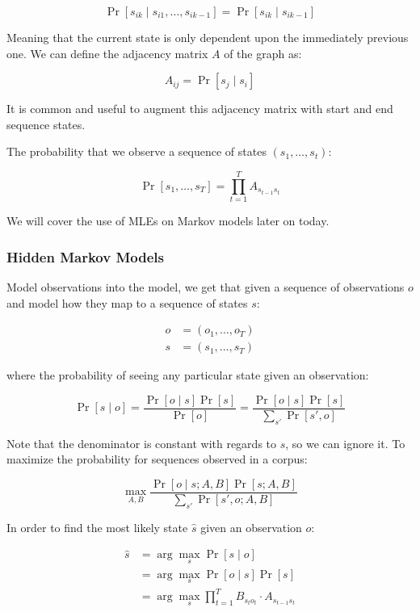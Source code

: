 \documentclass{idc_msc}
\begin{document}
\[
  \Pr[s_{ik} \mid s_{i1}, \ldots, s_{ik-1}] = \Pr[s_{ik} \mid s_{ik-1}]
\]

Meaning that the current state is only dependent upon the immediately previous one.
We can define the adjacency matrix \(A\) of the graph as:

\[
  A_{ij} = \Pr[s_j \mid s_i]
\]

It is common and useful to augment this adjacency matrix with start and end sequence states.

The probability that we observe a sequence of states \((s_1, \ldots, s_t)\):

\[
  \Pr[s_1, \ldots, s_T] = \prod_{t=1}^T A_{s_{t-1}s_t}
\]

We will cover the use of MLEs on Markov models later on today.

\subsubsection{Hidden Markov Models}

Model observations into the model, we get that given a sequence of observations \(o\) and model how they map to a sequence of states \(s\):

\[
\begin{aligned}
  o &= (o_1, \ldots, o_T) \\
  s &= (s_1, \ldots, s_T)
\end{aligned}
\]

where the probability of seeing any particular state given an observation:

\[
  \Pr[s \mid o] =
  \frac{\Pr[o \mid s] \Pr[s]}{\Pr[o]} =
  \frac{\Pr[o \mid s] \Pr[s]}{\sum_{s'} \Pr[s', o]}
\]

Note that the denominator is constant with regards to \(s\), so we can ignore it.
To maximize the probability for sequences observed in a corpus:

\[
  \max_{A,B} \frac{\Pr[o \mid s; A, B] \Pr[s; A, B]}{\sum_{s'} \Pr[s', o; A, B]}
\]

In order to find the most likely state \(\hat{s}\) given an observation \(o\):

\[
\begin{aligned}
  \hat{s} &= \arg \max_s \Pr[s \mid o] \\
  &= \arg \max_s \Pr[o \mid s] \Pr[s] \\
  &= \arg \max_s \prod_{t = 1}^T B_{s_t o_t} \cdot A_{s_{t-1} s_t}
\end{aligned}
\]
\end{document}
